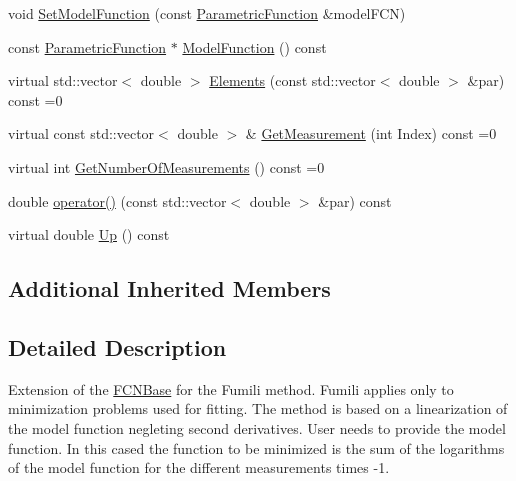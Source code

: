 \begin{DoxyCompactItemize}
\item 
void \mbox{\hyperlink{classROOT_1_1Minuit2_1_1FumiliMaximumLikelihoodFCN_a1aef27a37fc3a8df63aed6aff19c0c33}{Set\+Model\+Function}} (const \mbox{\hyperlink{classROOT_1_1Minuit2_1_1ParametricFunction}{Parametric\+Function}} \&model\+F\+CN)
\item 
const \mbox{\hyperlink{classROOT_1_1Minuit2_1_1ParametricFunction}{Parametric\+Function}} $\ast$ \mbox{\hyperlink{classROOT_1_1Minuit2_1_1FumiliMaximumLikelihoodFCN_ae1ea41126186d9dd5c83fdcec08cff70}{Model\+Function}} () const
\item 
virtual std\+::vector$<$ double $>$ \mbox{\hyperlink{classROOT_1_1Minuit2_1_1FumiliMaximumLikelihoodFCN_a20aa81dc23ba61ed49ba78f4f9627e59}{Elements}} (const std\+::vector$<$ double $>$ \&par) const =0
\item 
virtual const std\+::vector$<$ double $>$ \& \mbox{\hyperlink{classROOT_1_1Minuit2_1_1FumiliMaximumLikelihoodFCN_ac3e28c8d3e14a1df3145891ae99ac35d}{Get\+Measurement}} (int Index) const =0
\item 
virtual int \mbox{\hyperlink{classROOT_1_1Minuit2_1_1FumiliMaximumLikelihoodFCN_af0a6b5a302f978363074039c7d55d529}{Get\+Number\+Of\+Measurements}} () const =0
\item 
double \mbox{\hyperlink{classROOT_1_1Minuit2_1_1FumiliMaximumLikelihoodFCN_ad06826a1cde84be6bf2a13518c768ca5}{operator()}} (const std\+::vector$<$ double $>$ \&par) const
\item 
virtual double \mbox{\hyperlink{classROOT_1_1Minuit2_1_1FumiliMaximumLikelihoodFCN_ab945da701895bfba143da08f76ba2d05}{Up}} () const
\end{DoxyCompactItemize}
\subsection*{Additional Inherited Members}


\subsection{Detailed Description}
Extension of the \mbox{\hyperlink{classROOT_1_1Minuit2_1_1FCNBase}{F\+C\+N\+Base}} for the Fumili method. Fumili applies only to minimization problems used for fitting. The method is based on a linearization of the model function negleting second derivatives. User needs to provide the model function. In this cased the function to be minimized is the sum of the logarithms of the model function for the different measurements times -\/1.

